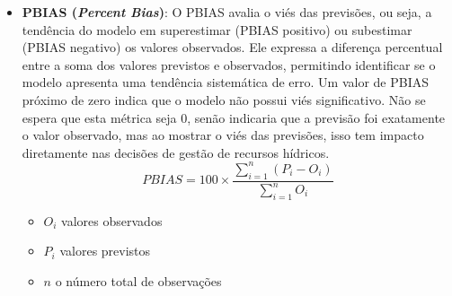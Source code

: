 \begin{itemize}
	
	\item \textbf{PBIAS (\textit{Percent Bias})}: O PBIAS avalia o viés das previsões, ou seja, a tendência do modelo em superestimar (PBIAS positivo) ou subestimar (PBIAS negativo) os valores observados. Ele expressa a diferença percentual entre a soma dos valores previstos e observados, permitindo identificar se o modelo apresenta uma tendência sistemática de erro. Um valor de PBIAS próximo de zero indica que o modelo não possui viés significativo. Não se espera que esta métrica seja 0, senão indicaria que a previsão foi exatamente o valor observado, mas ao mostrar o viés das previsões, isso tem impacto diretamente nas decisões de gestão de recursos hídricos.\cite{rayyan-33388455}
	\begin{equation}
		PBIAS = 100 \times \frac{\sum_{i=1}^{n} (P_i - O_i)}{\sum_{i=1}^{n} O_i}
	\end{equation}
	\begin{itemize}
		\item $O_i$ valores observados
		\item $P_i$ valores previstos
		\item $n$ o número total de observações
	\end{itemize}
	

\end{itemize}
